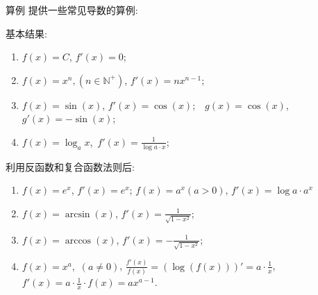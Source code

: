 \documentclass[
10pt,
aspectratio=43,
]{beamer}
\begin{document}
\begin{frame}{算例}
	提供一些常见导数的算例:
	\begin{block}{}
		{\small 基本结果:
			\begin{enumerate}
				\item $f(x)=C$,  $f'(x) =0$;
				\item $f(x)=x^n, (n\in\mathbb{N}^+)$,  $f'(x) = n x^{n-1}$;
				\item $f(x)=\sin(x)$,  $f'(x)=\cos(x)$; \,\, $g(x)=\cos(x)$,  $g'(x)=-\sin(x)$;
				\item $f(x)=\log_a  x$,\, $f'(x)= \displaystyle\frac{1}{\log a \cdot x}$;
			\end{enumerate}
			利用反函数和复合函数法则后:
			\begin{enumerate}
				\item $f(x) = e^x$, $f'(x) = e^x$; $f(x)=a^x(a>0)$, $f'(x)=\log a \cdot a^x$
				\item $f(x) = \arcsin(x)$, $f'(x) = \displaystyle\frac{1}{\sqrt{1-x^2}}$;
				\item $f(x) = \arccos(x)$, $f'(x) = \displaystyle-\frac{1}{\sqrt{1-x^2}}$;
				\item $f(x) = x^a,\,\,(a\neq0)$, $\frac{f'(x)}{f(x)}=\left(\log(f(x))\right)'=a\cdot \frac 1x$, $f'(x)=a\cdot\frac1x\cdot f(x)=ax^{a-1}$.
			\end{enumerate}
		}
	\end{block}
\end{frame}
\end{document}
